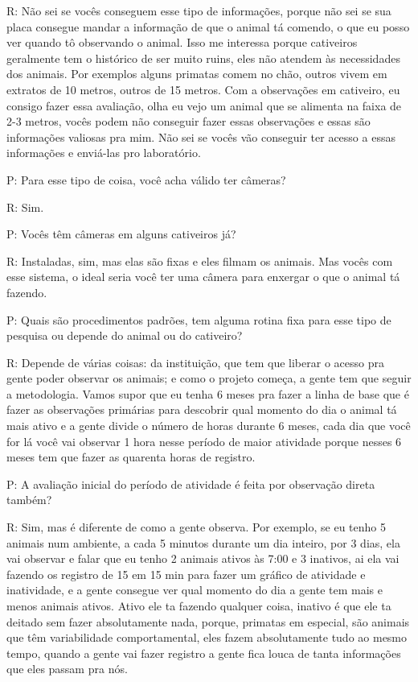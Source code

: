 R: Não sei se vocês conseguem esse tipo de informações, porque não sei se sua placa consegue mandar a informação de que o animal tá comendo, o que eu posso ver quando tô observando o animal. Isso me interessa porque cativeiros geralmente tem o histórico de ser muito ruins, eles não atendem às necessidades dos animais. Por exemplos alguns primatas comem no chão, outros vivem em extratos de 10 metros, outros de 15 metros. Com a observações em cativeiro, eu consigo fazer essa avaliação, olha eu vejo um animal que se alimenta na faixa de 2-3 metros, vocês podem não conseguir fazer essas observações e essas são informações valiosas pra mim. Não sei se vocês vão conseguir ter acesso a essas informações e enviá-las pro laboratório.


P: Para esse tipo de coisa, você acha válido ter câmeras?

R: Sim.


P: Vocês têm câmeras em alguns cativeiros já?

R: Instaladas, sim, mas elas são fixas e eles filmam os animais. Mas vocês com esse sistema, o ideal seria você ter uma câmera para enxergar o que o animal tá fazendo.


P: Quais são procedimentos padrões, tem alguma rotina fixa para esse tipo de pesquisa ou depende do animal ou do cativeiro?

R: Depende de várias coisas: da instituição, que tem que liberar o acesso pra gente poder observar os animais; e como o projeto começa, a gente tem que seguir a metodologia. Vamos supor que eu tenha 6 meses pra fazer a linha de base que é fazer as observações primárias para descobrir qual momento do dia o animal tá mais ativo e a gente divide o número de horas durante 6 meses, cada dia que você for lá você vai observar 1 hora nesse período de maior atividade porque nesses 6 meses tem que fazer as quarenta horas de registro.


P: A avaliação inicial do período de atividade é feita por observação direta também?

R: Sim, mas é diferente de como a gente observa. Por exemplo, se eu tenho 5 animais num ambiente, a cada 5 minutos durante um dia inteiro, por 3 dias, ela vai observar e falar que eu tenho 2 animais ativos às 7:00 e 3 inativos, ai ela vai fazendo os registro de 15 em 15 min para fazer um gráfico de atividade e inatividade, e a gente consegue ver qual momento do dia a gente tem mais e menos animais ativos. Ativo ele ta fazendo qualquer coisa, inativo é que ele ta deitado sem fazer absolutamente nada, porque, primatas em especial, são animais que têm variabilidade comportamental, eles fazem absolutamente tudo ao mesmo tempo, quando a gente vai fazer registro a gente fica louca de tanta informações que eles passam pra nós.


